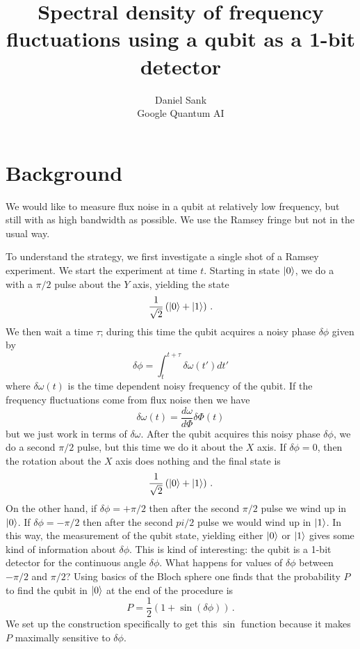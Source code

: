 \documentclass[twocolumn]{article}
\author{Daniel Sank \\ \small{Google Quantum AI}}
\title{Spectral density of frequency fluctuations using a qubit as a 1-bit detector}
\begin{document}
\maketitle

\section{Background}

We would like to measure flux noise in a qubit at relatively low frequency, but still with as high bandwidth as possible.
We use the Ramsey fringe but not in the usual way.


To understand the strategy, we first investigate a single shot of a Ramsey experiment.
We start the experiment at time $t$.
Starting in state $| 0 \rangle$, we do a with a $\pi / 2$ pulse about the $Y$ axis, yielding the state
\begin{displaymath}
\frac{1}{\sqrt{2}} \left( | 0 \rangle + | 1 \rangle \right) \, .
\end{displaymath}
We then wait a time $\tau$; during this time the qubit acquires a noisy phase $\delta \phi$ given by
\begin{equation}
\delta \phi = \int_t^{t+\tau} \delta \omega(t') dt'
\end{equation}
where $\delta \omega(t)$ is the time dependent noisy frequency of the qubit.
If the frequency fluctuations come from flux noise then we have
\begin{equation}
\delta \omega(t) = \frac{d\omega}{d \Phi} \delta \Phi (t)
\end{equation}
but we just work in terms of $\delta \omega$.
After the qubit acquires this noisy phase $\delta \phi$, we do a second $\pi / 2$ pulse, but this time we do it about the $X$ axis.
If $\delta \phi = 0$, then the rotation about the $X$ axis does nothing and the final state is
\begin{equation}
\frac{1}{\sqrt{2}} \left( | 0 \rangle + | 1 \rangle \right) \, .
\end{equation}
On the other hand, if $\delta \phi = +\pi/2$ then after the second $\pi/2$ pulse we wind up in $| 0 \rangle$.
If $\delta \phi = -\pi/2$ then after the second $pi/2$ pulse we would wind up in $| 1 \rangle$.
In this way, the measurement of the qubit state, yielding either $| 0 \rangle$ or $| 1 \rangle$ gives some kind of information about $\delta \phi$.
This is kind of interesting: the qubit is a 1-bit detector for the continuous angle $\delta \phi$.
What happens for values of $\delta \phi$ between $-\pi / 2$ and $\pi / 2$?
Using basics of the Bloch sphere one finds that the probability $P$ to find the qubit in $| 0 \rangle$ at the end of the procedure is
\begin{equation}
P = \frac{1}{2} \left( 1 + \sin (\delta \phi) \right) \, .
\end{equation}
We set up the construction specifically to get this $\sin$ function because it makes $P$ maximally sensitive to $\delta \phi$.
\end{document}
